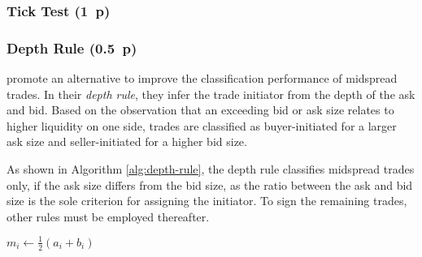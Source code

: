 \subsubsection{Tick Test (1~p)}\label{sec:tick-test}




\subsubsection{Depth Rule (0.5~p)}\label{sec:depth-rule}

\textcite{grauerOptionTradeClassification2022} promote an alternative to improve the classification performance of midspread trades. In their \textit{depth rule}, they infer the trade initiator from the depth of the ask and bid. Based on the observation that an exceeding bid or ask size relates to higher liquidity on one side, trades are classified as buyer-initiated for a larger ask size and seller-initiated for a higher bid size.

As shown in Algorithm \ref{alg:depth-rule}, the depth rule classifies midspread trades only, if the ask size differs from the bid size, as the ratio between the ask and bid size is the sole criterion for assigning the initiator. To sign the remaining trades, other rules must be employed thereafter.

\begin{algorithm}


  \caption{$\operatorname{\mathtt{depth}}$ \label{sec:alg:depth-rule}}


  \BlankLine %

  $m_i \leftarrow \frac{1}{2}(a_i + b_i)$ 

\end{algorithm}

